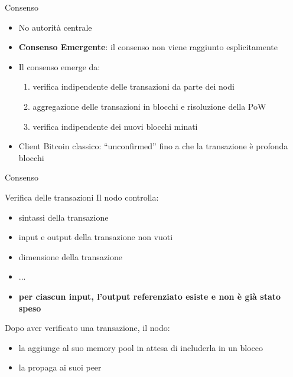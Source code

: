 \documentclass{beamer}
\begin{document}
  
  
  \begin{frame}{Consenso}
    \begin{itemize}
        \item No autorità centrale
        \item \textbf{Consenso Emergente}: il consenso non viene raggiunto esplicitamente
        \item Il consenso emerge da:
        \begin{enumerate}
            \item verifica indipendente delle transazioni da parte dei nodi
            \item aggregazione delle transazioni in blocchi e risoluzione della PoW
            \item verifica indipendente dei nuovi blocchi minati 
        \end{enumerate}
        \item Client Bitcoin classico:  ``unconfirmed'' fino a che la transazione è profonda blocchi
    \end{itemize}
  \end{frame}
  
  
  
  
  \begin{frame}{Consenso}
      \begin{block}{Verifica delle transazioni}
      Il nodo controlla: 
        \begin{itemize}
            \item sintassi della transazione
            \item input e output della transazione non vuoti
            \item dimensione della transazione 
            \item ...
            \item \textbf{per ciascun input, l'output referenziato esiste e non è già stato speso}
        \end{itemize}
      \end{block}
      Dopo aver verificato una transazione, il nodo:
      \begin{itemize}
          \item la aggiunge al suo memory pool in attesa di includerla in un blocco
          \item la propaga ai suoi peer
      \end{itemize}
  \end{frame}
  
\end{document}
